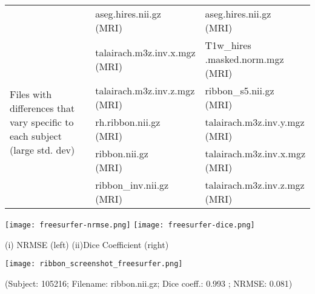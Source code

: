 \begin{center}
\begin{longtable}{|p{}|p{}|p{}|}
& \makecell[l]{aseg.hires.nii.gz\\(MRI)}  & \makecell[l]{aseg.hires.nii.gz\\(MRI)} \\\cline{1-3}
\multirow{5}{.3\textwidth}{Files with differences that vary specific to each subject (large std. dev)}   & \makecell[l]{talairach.m3z.inv.x.mgz\\(MRI)}  & \makecell[l]{T1w\_hires\\.masked.norm.mgz\\(MRI)} \\\cline{2-3}
& \makecell[l]{talairach.m3z.inv.z.mgz\\(MRI)}                 & \makecell[l]{ribbon\_s5.nii.gz\\(MRI)} \\\cline{2-3}
& \makecell[l]{rh.ribbon.nii.gz\\(MRI)}                                                            & \makecell[l]{talairach.m3z.inv.y.mgz\\(MRI)} \\\cline{2-3}
& \makecell[l]{ribbon.nii.gz\\(MRI)}                   & \makecell[l]{talairach.m3z.inv.x.mgz\\(MRI)} \\\cline{2-3}
& \makecell[l]{ribbon\_inv.nii.gz\\(MRI)}                                                   & \makecell[l]{talairach.m3z.inv.z.mgz\\(MRI)} \\\cline{1-3}
\end{longtable}
\label{tab:FreeSurfer_comparison_table}
\end{center}
\hfill \break

\begin{center}
\texttt{[image: freesurfer-nrmse.png]}%
\texttt{[image: freesurfer-dice.png]}
\caption*{(i) NRMSE (left) (ii)Dice Coefficient (right)}
\label{fig:freesurfer_metric_values}
\end{center}

\hfill \break
\begin{center}
\texttt{[image: ribbon\_screenshot\_freesurfer.png]}
\caption*{(Subject: 105216; Filename: ribbon.nii.gz; Dice coeff.: 0.993 ; NRMSE: 0.081)}
\label{fig:freesurfer_ribbon_file}
\end{center}

